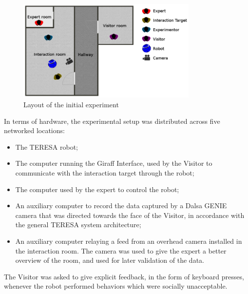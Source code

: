 \documentclass[a4paper,11pt]{report}
\begin{document}
\begin{figure}
    \centering
    \includegraphics[width=0.8\textwidth]{figures/experiment_setup_new.jpg}
    \caption{Layout of the initial experiment}
    	\label{fig:experiment_setup}
\end{figure} 

In terms of hardware, the experimental setup was distributed across five networked locations:
\begin{itemize}
\item The TERESA robot;
\item The computer running the Giraff Interface, used by the Visitor to communicate with the interaction target through the robot;
\item The computer used by the expert to control the robot;
\item An auxiliary computer to record the data captured by a Dalsa GENIE camera that was directed towards the face of the Visitor, in accordance with the general TERESA system architecture;
\item An auxiliary computer relaying a feed from an overhead camera installed in the interaction room. The camera was used to give the expert a better overview of the room, and used for later validation of the data.
\end{itemize}

The Visitor was asked to give explicit feedback, in the form of keyboard presses, whenever the robot performed behaviors which were socially unacceptable.
\end{document}
